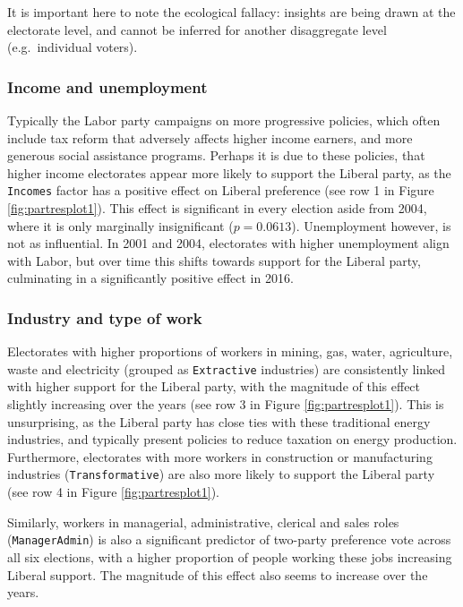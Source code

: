 \documentclass[11pt,a4paper,]{article}
\begin{document}
It is important here to note the ecological fallacy: insights are being drawn at the electorate level, and cannot be inferred for another disaggregate level (e.g.~individual voters).

\hypertarget{income-and-unemployment}{%
\subsubsection{Income and unemployment}\label{income-and-unemployment}}

Typically the Labor party campaigns on more progressive policies, which often include tax reform that adversely affects higher income earners, and more generous social assistance programs. Perhaps it is due to these policies, that higher income electorates appear more likely to support the Liberal party, as the \texttt{Incomes} factor has a positive effect on Liberal preference (see row 1 in Figure \ref{fig:partresplot1}). This effect is significant in every election aside from 2004, where it is only marginally insignificant (\(p = 0.0613\)). Unemployment however, is not as influential. In 2001 and 2004, electorates with higher unemployment align with Labor, but over time this shifts towards support for the Liberal party, culminating in a significantly positive effect in 2016.

\hypertarget{industry-and-type-of-work}{%
\subsubsection{Industry and type of work}\label{industry-and-type-of-work}}

Electorates with higher proportions of workers in mining, gas, water, agriculture, waste and electricity (grouped as \texttt{Extractive} industries) are consistently linked with higher support for the Liberal party, with the magnitude of this effect slightly increasing over the years (see row 3 in Figure \ref{fig:partresplot1}). This is unsurprising, as the Liberal party has close ties with these traditional energy industries, and typically present policies to reduce taxation on energy production. Furthermore, electorates with more workers in construction or manufacturing industries (\texttt{Transformative}) are also more likely to support the Liberal party (see row 4 in Figure \ref{fig:partresplot1}).

Similarly, workers in managerial, administrative, clerical and sales roles (\texttt{ManagerAdmin}) is also a significant predictor of two-party preference vote across all six elections, with a higher proportion of people working these jobs increasing Liberal support. The magnitude of this effect also seems to increase over the years.
\end{document}
